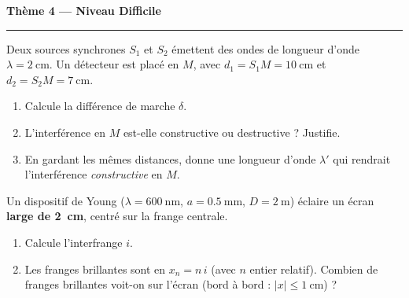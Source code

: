\documentclass[11pt,a4paper]{article}
\begin{document}
\begin{center}
{\large\bfseries\color{primarydark} Thème 4 — Niveau Difficile}\\[-2pt]
{\color{primary}\rule{5cm}{1pt}}
\end{center}

\begin{exo}
Deux sources synchrones $S_1$ et $S_2$ émettent des ondes de longueur d'onde
$\lambda=\SI{2}{\centi\metre}$. Un détecteur est placé en $M$, avec $d_1=S_1M=\SI{10}{\centi\metre}$
et $d_2=S_2M=\SI{7}{\centi\metre}$.
\begin{center}
\end{center}
\begin{enumerate}[label=\alph*)]
  \item Calcule la différence de marche $\delta$.
  \item L'interférence en $M$ est-elle constructive ou destructive ? Justifie.
  \item En gardant les mêmes distances, donne une longueur d'onde $\lambda'$ qui rendrait
        l'interférence \emph{constructive} en $M$.
\end{enumerate}
\end{exo}

\begin{exo}
Un dispositif de Young ($\lambda=\SI{600}{\nano\metre}$, $a=\SI{0.5}{\milli\metre}$,
$D=\SI{2}{\metre}$) éclaire un écran \textbf{large de \SI{2}{\centi\metre}}, centré sur la
frange centrale.
\begin{enumerate}[label=\alph*)]
  \item Calcule l'interfrange $i$.
  \item Les franges brillantes sont en $x_n=n\,i$ (avec $n$ entier relatif). Combien de franges
        brillantes voit-on sur l'écran (bord à bord : $|x|\le\SI{1}{\centi\metre}$) ?
\end{enumerate}
\end{exo}
\end{document}
